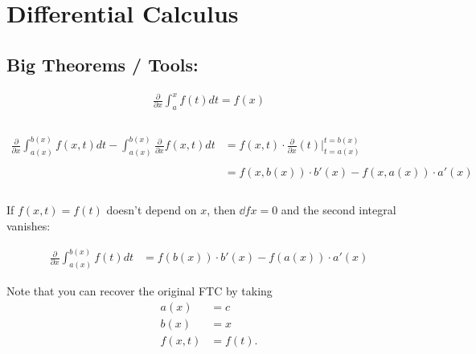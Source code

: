 \hypertarget{differential-calculus}{%
\section{Differential Calculus}\label{differential-calculus}}

\hypertarget{big-theorems-tools}{%
\subsection{Big Theorems / Tools:}\label{big-theorems-tools}}

\begin{proposition}

\begin{align*}
\frac{\partial}{\partial x} \int_a^x f(t) dt = f(x) \\ \\
\end{align*}

\end{proposition}

\begin{proposition}

\begin{align*}
\frac{\partial}{\partial x} \int_{a(x)}^{b(x)} f(x, t) dt - \int_{a(x)}^{b(x)} \frac{\partial}{\partial x} f(x, t) dt &=
f(x, t) \cdot \frac{\partial}{\partial x}(t) \bigg\rvert_{t=a(x)}^{t=b(x)} \\ \\
&= f(x, b(x))\cdot b'(x) - f(x, a(x))\cdot a'(x) \\ \\
\end{align*}

If \(f(x,t) = f(t)\) doesn't depend on \(x\), then \(\dd{f}{x} = 0\) and
the second integral vanishes:

\begin{align*}
\frac{\partial}{\partial x} \int_{a(x)}^{b(x)} f(t) dt 
&= f(b(x))\cdot b'(x) - f(a(x))\cdot a'(x)
\end{align*}

\end{proposition}


\begin{remark}

Note that you can recover the original FTC by taking
\begin{align*}  
a(x) &= c \\
b(x) &= x \\
f(x,t) &= f(t)
.\end{align*}

\end{remark}

